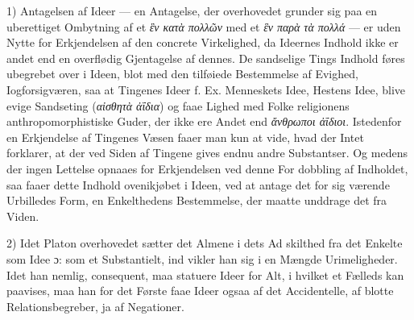 \documentclass[12pt,a4paper]{book}
\newcommand{\gk}[1]{\textit{#1}}
\begin{document}
1) Antagelsen af Ideer --- en Antagelse, der overhovedet
grunder sig paa en uberettiget Ombytning af et \gk{ἓν κατὰ}
\gk{πολλῶν} med et \gk{ἓν παρὰ τὰ πολλά} --- er uden Nytte for
Erkjendelsen af den concrete Virkelighed, da Ideernes Indhold
ikke er andet end en overflødig Gjentagelse af dennes. De
sandselige Tings Indhold føres ubegrebet over i Ideen, blot
med den tilføiede Bestemmelse af Evighed, Iogforsigværen, saa
at Tingenes Ideer f. Ex. Menneskets Idee, Hestens Idee, blive
evige Sandseting (\gk{αἰσθητὰ ἀΐδια}) og faae Lighed med Folke\-%
religionens anthropomorphistiske Guder, der ikke ere Andet end
\gk{ἄνθρωποι ἀΐδιοι}. Istedenfor en Erkjendelse af Tingenes Væsen
faaer man kun at vide, hvad der Intet forklarer, at der ved
Siden af Tingene gives endnu andre Substantser. Og medens
der ingen Lettelse opnaaes for Erkjendelsen ved denne For\-%
dobbling af Indholdet, saa faaer dette Indhold ovenikjøbet i
Ideen, ved at antage det for sig værende Urbilledes Form,
en Enkelthedens Bestemmelse, der maatte unddrage det fra
Viden.

2) Idet Platon overhovedet sætter det Almene i dets Ad\-%
skilthed fra det Enkelte som Idee ɔ: som et Substantielt, ind\-%
vikler han sig i en Mængde Urimeligheder. Idet han nemlig,
consequent, maa statuere Ideer for Alt, i hvilket et Fælleds
kan paavises, maa han for det Første faae Ideer ogsaa af det
Accidentelle, af blotte Relationsbegreber, ja af Negationer.
\end{document}
